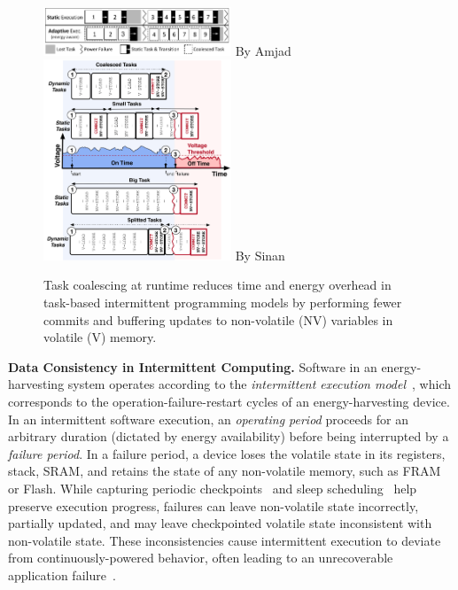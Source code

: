 \begin{figure}
    \centering
    \includegraphics[width=0.5\textwidth]{figures/Coala_Intro_Figure.pdf} By Amjad
    \includegraphics[width=0.5\textwidth]{figures/graffle/intro-figure.pdf} By Sinan
    \caption{ %
        Task coalescing at runtime reduces time and energy overhead in
task-based intermittent programming models by performing fewer commits and
buffering updates to non-volatile (NV) variables in volatile (V) memory.}
    \label{fig:coalesce}
\end{figure}

\textbf{Data Consistency in Intermittent Computing.}  Software in an
energy-harvesting system operates according to the {\em intermittent execution
model}~\citep{dino,lucia_snapl_2017}, which corresponds to the
operation-failure-restart cycles of an energy-harvesting device. In an
intermittent software execution, an {\em operating period} proceeds for an
arbitrary duration (dictated by energy availability) before being interrupted
by a {\em failure period}. In a failure period, a device loses the volatile
state in its registers, stack, SRAM, and retains the state of any non-volatile
memory, such as FRAM or Flash. While capturing periodic
checkpoints~\citep{mementos,quickrecall} and sleep
scheduling~\citep{dewdrop,hibernus,hibernusplusplus} help preserve execution
progress, failures can leave non-volatile state incorrectly, partially updated,
and may leave checkpointed volatile state inconsistent with non-volatile state.
These inconsistencies cause intermittent execution to deviate from
continuously-powered behavior, often leading to an unrecoverable
application failure~\citep{dino,edb}. 

